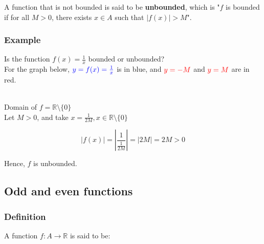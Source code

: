 \documentclass[11pt]{article}
\begin{document}
A function that is not bounded is said to be \textbf{unbounded}, which is "\(f\) is bounded if for all \(M > 0\), there exists \(x \in A\) such that \(|f(x)| > M\)".

\newpage

\subsubsection{Example}
\label{sec:orga0db1a7}
Is the function \(f(x) = \frac{1}{x}\) bounded or unbounded?
\\[0pt]

For the graph below, \(\color{blue} y = f(x) = \frac{1}{x}\) is in blue, and \(\color{red} y = -M\) and \(\color{red} y = M\) are in red.
\\[0pt]

\\[0pt]

Domain of \(f = \mathbb{R} \setminus \{0\}\)
\\[0pt]

Let \(M > 0\), and take \(x = \frac{1}{2M}, x \in \mathbb{R} \setminus \{0\}\)

\[|f(x)| = \left|\frac{1}{\frac{1}{2M}} \right| = |2M| = 2M > 0\]

Hence, \(f\) is unbounded.

\newpage

\subsection{Odd and even functions}
\label{sec:org0d8db97}

\subsubsection{Definition}
\label{sec:org9e724d4}
A function \(f : A \rightarrow \mathbb{R}\) is said to be:
\end{document}
